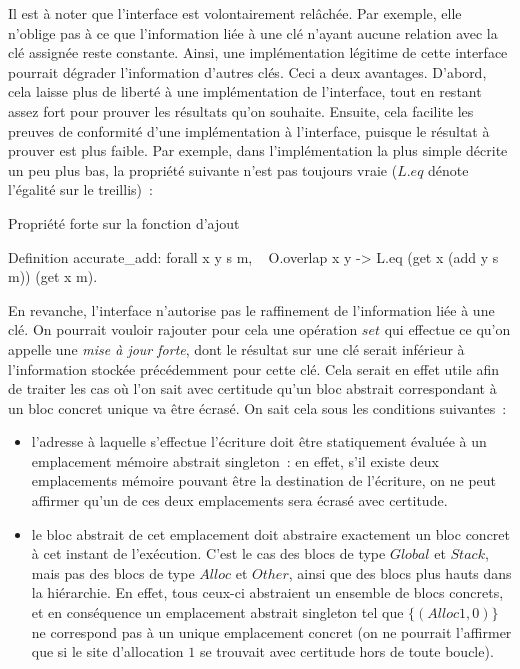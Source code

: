 \documentclass{article}
\begin{document}
Il est à noter que l'interface est volontairement relâchée. Par exemple, elle
n'oblige pas à ce que l'information liée à une clé n'ayant aucune relation avec
la clé assignée reste constante. Ainsi, une implémentation légitime de cette
interface pourrait dégrader l'information d'autres clés. Ceci a deux avantages.
D'abord, cela laisse plus de liberté à une implémentation de l'interface, tout
en restant assez fort pour prouver les résultats qu'on souhaite. Ensuite, cela
facilite les preuves de conformité d'une implémentation à l'interface, puisque
le résultat à prouver est plus faible. Par exemple, dans l'implémentation la
plus simple décrite un peu plus bas, la propriété suivante n'est pas toujours
vraie ($L.eq$ dénote l'égalité sur le treillis)~:

\begin{coqcode}
\caption{Propriété forte sur la fonction d'ajout}
\begin{english}
\begin{coq}
Definition accurate_add: forall x y s m,
  ~ O.overlap x y -> L.eq (get x (add y s m)) (get x m).
\end{coq}
\end{english}
\end{coqcode}

En revanche, l'interface n'autorise pas le raffinement de l'information liée à
une clé. On pourrait vouloir rajouter pour cela une opération $set$
qui effectue ce qu'on appelle une {\it mise à jour forte}, dont le résultat sur
une clé serait inférieur à l'information stockée précédemment pour cette clé.
Cela serait en effet utile afin de traiter les cas où l'on sait avec certitude
qu'un bloc abstrait correspondant à un bloc concret unique va être écrasé. On
sait cela sous les conditions suivantes~:

\begin{itemize}

\item l'adresse à laquelle s'effectue l'écriture doit être statiquement évaluée
à un emplacement mémoire abstrait singleton~: en effet, s'il existe deux
emplacements mémoire pouvant être la destination de l'écriture, on ne peut
affirmer qu'un de ces deux emplacements sera écrasé avec certitude.

\item le bloc abstrait de cet emplacement doit abstraire exactement un bloc
concret à cet instant de l'exécution. C'est le cas des blocs de type
$Global$ et $Stack$, mais pas des blocs de type
$Alloc$ et $Other$, ainsi que des blocs plus hauts dans
la hiérarchie. En effet, tous ceux-ci abstraient un ensemble de blocs concrets,
et en conséquence un emplacement abstrait singleton tel que $\{(Alloc 1, 0)\}$
ne correspond pas à un unique emplacement concret (on ne pourrait l'affirmer
que si le site d'allocation $1$ se trouvait avec certitude hors de toute
boucle).

\end{itemize}
\end{document}
